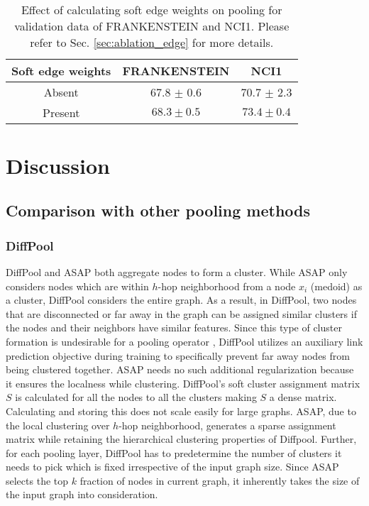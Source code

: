 \documentclass[letterpaper]{article} \usepackage{aaai20}  \usepackage{times}  \usepackage{helvet} \usepackage{courier}  \usepackage[hyphens]{url}  \usepackage{graphicx} \urlstyle{rm} \def\UrlFont{\rm}  \usepackage{graphicx}  \frenchspacing  \setlength{\pdfpagewidth}{8.5in}  \setlength{\pdfpageheight}{11in}
\begin{document}
\begin{table}[!tbh]\
	\centering
	\begin{tabular}{ccc}
		\toprule
		Soft edge weights & \textsc{FRANKENSTEIN} & \textsc{NCI1} \\
		\midrule
		Absent & 67.8 $\pm$ 0.6 & 70.7 $\pm$ 2.3 \\
		Present & $\mathbf{68.3 \pm 0.5}$ & $\mathbf{73.4 \pm 0.4}$\\
		\bottomrule
	\end{tabular}
	\caption{\label{tab:stas} Effect of calculating soft edge weights on pooling for validation data of FRANKENSTEIN and NCI1. Please refer to Sec. \ref{sec:ablation_edge} for more details.}
\end{table} 
\section{Discussion}


\subsection{Comparison with other pooling methods}
\label{sec:discussion_comp}
\subsubsection{DiffPool}
DiffPool and ASAP both aggregate nodes to form a cluster. While ASAP only considers nodes which are within $h$-hop neighborhood from a node $x_{i}$ (medoid) as a cluster, DiffPool considers the entire graph. As a result, in DiffPool, two nodes that are disconnected or far away in the graph can be assigned similar clusters if the nodes and their neighbors have similar features. Since this type of cluster formation is undesirable for a pooling operator \cite{diffpool}, DiffPool utilizes an auxiliary link prediction objective during training to specifically prevent far away nodes from being clustered together. ASAP needs no such additional regularization because it ensures the localness while clustering. DiffPool's soft cluster assignment matrix $S$ is calculated for all the nodes to all the clusters making $S$ a dense matrix. Calculating and storing this does not scale easily for large graphs. ASAP, due to the local clustering over $h$-hop neighborhood, generates a sparse assignment matrix while retaining the hierarchical clustering properties of Diffpool. Further, for each pooling layer, DiffPool has to predetermine the number of clusters it needs to pick which is fixed irrespective of the input graph size. Since ASAP selects the top $k$ fraction of nodes in current graph, it inherently takes the size of the input graph into consideration. 
\end{document}
